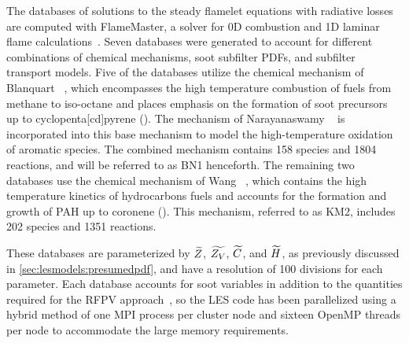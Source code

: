 The databases of solutions to the steady flamelet equations with radiative losses are computed with FlameMaster, a solver for 0D combustion and 1D laminar flame calculations~\cite{flamemaster}. Seven databases were generated to account for different combinations of chemical mechanisms, soot subfilter PDFs, and subfilter transport models. Five of the databases utilize the chemical mechanism of Blanquart \etal~\cite{blanquart2009588}, which encompasses the high temperature combustion of fuels from methane to iso-octane and places emphasis on the formation of soot precursors up to cyclopenta[cd]pyrene (). The mechanism of Narayanaswamy \etal~\cite{narayanaswamy2010} is incorporated into this base mechanism to model the high-temperature oxidation of aromatic species. The combined mechanism contains 158 species and 1804 reactions, and will be referred to as BN1 henceforth. The remaining two databases use the chemical mechanism of Wang \etal~\cite{wang2013}, which contains the high temperature kinetics of  hydrocarbons fuels and accounts for the formation and growth of PAH up to coronene (). This mechanism, referred to as KM2, includes 202 species and 1351 reactions.

These databases are parameterized by $\widetilde{Z}$, $\widetilde{Z_V}$, $\widetilde{C}$, and $\widetilde{H}$, as previously discussed in \cref{sec:lesmodels:presumedpdf}, and have a resolution of 100 divisions for each parameter. Each database accounts for soot variables in addition to the quantities required for the RFPV approach~\cite{ihme2008}, so the LES code has been parallelized using a hybrid method of one MPI process per cluster node and sixteen OpenMP threads per node to accommodate the large memory requirements.
